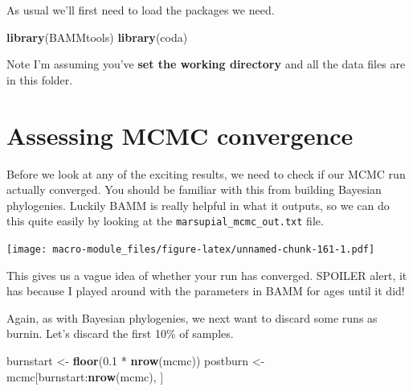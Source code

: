 \documentclass[]{book}
\newenvironment{Shaded}{\begin{snugshade}}{\end{snugshade}}
\newcommand{\KeywordTok}[1]{\textcolor[rgb]{0.13,0.29,0.53}{\textbf{{#1}}}}
\newcommand{\FloatTok}[1]{\textcolor[rgb]{0.00,0.00,0.81}{{#1}}}
\newcommand{\StringTok}[1]{\textcolor[rgb]{0.31,0.60,0.02}{{#1}}}
\newcommand{\CommentTok}[1]{\textcolor[rgb]{0.56,0.35,0.01}{\textit{{#1}}}}
\newcommand{\NormalTok}[1]{{#1}}
\begin{document}
As usual we'll first need to load the packages we need.

\begin{Shaded}
\begin{Highlighting}[]
\KeywordTok{library}\NormalTok{(BAMMtools)}
\KeywordTok{library}\NormalTok{(coda)}
\end{Highlighting}
\end{Shaded}

Note I'm assuming you've \textbf{set the working directory} and all the
data files are in this folder.

\section{Assessing MCMC convergence}\label{assessing-mcmc-convergence}

Before we look at any of the exciting results, we need to check if our
MCMC run actually converged. You should be familiar with this from
building Bayesian phylogenies. Luckily BAMM is really helpful in what it
outputs, so we can do this quite easily by looking at the
\texttt{marsupial\_mcmc\_out.txt} file.

\begin{Shaded}
\end{Shaded}

\texttt{[image: macro-module\_files/figure-latex/unnamed-chunk-161-1.pdf]}

This gives us a vague idea of whether your run has converged. SPOILER
alert, it has because I played around with the parameters in BAMM for
ages until it did!

Again, as with Bayesian phylogenies, we next want to discard some runs
as burnin. Let's discard the first 10\% of samples.

\begin{Shaded}
\begin{Highlighting}[]
\NormalTok{burnstart <-}\StringTok{ }\KeywordTok{floor}\NormalTok{(}\FloatTok{0.1} \NormalTok{*}\StringTok{ }\KeywordTok{nrow}\NormalTok{(mcmc))}
\NormalTok{postburn <-}\StringTok{ }\NormalTok{mcmc[burnstart:}\KeywordTok{nrow}\NormalTok{(mcmc), ]}
\end{Highlighting}
\end{Shaded}
\end{document}
